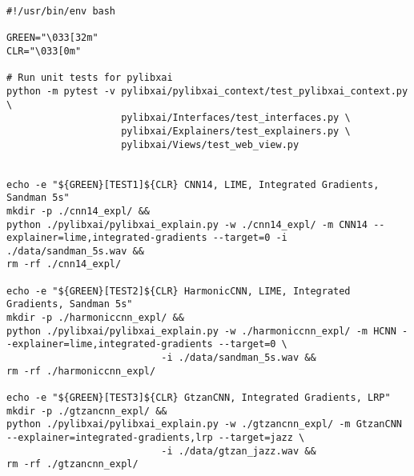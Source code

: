 \documentclass[
    bindingoffset=5mm,  %
    footnoteindent=3mm, %
    hyphenation=true    %
]{src/wut-thesis}
\begin{document}
\clearpage
{} \label{appendix:TestingListing}

\begin{verbatim}
#!/usr/bin/env bash

GREEN="\033[32m"
CLR="\033[0m"

# Run unit tests for pylibxai
python -m pytest -v pylibxai/pylibxai_context/test_pylibxai_context.py \
                    pylibxai/Interfaces/test_interfaces.py \
                    pylibxai/Explainers/test_explainers.py \
                    pylibxai/Views/test_web_view.py


echo -e "${GREEN}[TEST1]${CLR} CNN14, LIME, Integrated Gradients, Sandman 5s"
mkdir -p ./cnn14_expl/ &&
python ./pylibxai/pylibxai_explain.py -w ./cnn14_expl/ -m CNN14 --explainer=lime,integrated-gradients --target=0 -i ./data/sandman_5s.wav &&
rm -rf ./cnn14_expl/

echo -e "${GREEN}[TEST2]${CLR} HarmonicCNN, LIME, Integrated Gradients, Sandman 5s"
mkdir -p ./harmoniccnn_expl/ &&
python ./pylibxai/pylibxai_explain.py -w ./harmoniccnn_expl/ -m HCNN --explainer=lime,integrated-gradients --target=0 \
                           -i ./data/sandman_5s.wav &&
rm -rf ./harmoniccnn_expl/

echo -e "${GREEN}[TEST3]${CLR} GtzanCNN, Integrated Gradients, LRP"
mkdir -p ./gtzancnn_expl/ &&
python ./pylibxai/pylibxai_explain.py -w ./gtzancnn_expl/ -m GtzanCNN --explainer=integrated-gradients,lrp --target=jazz \
                           -i ./data/gtzan_jazz.wav &&
rm -rf ./gtzancnn_expl/
\end{verbatim}
\end{document}
